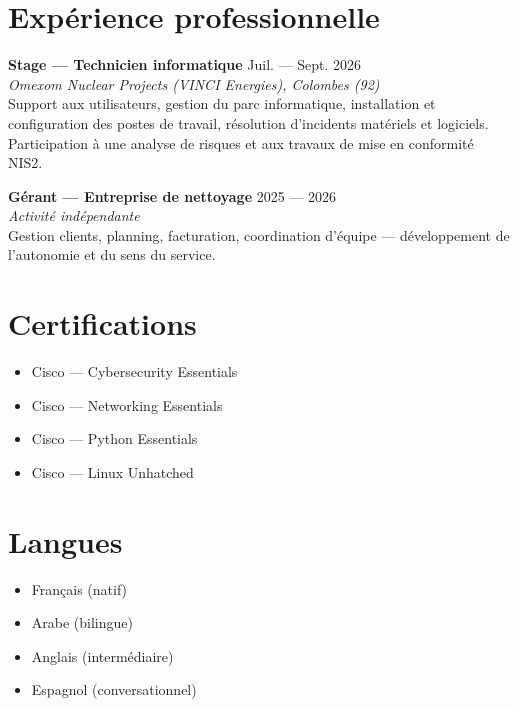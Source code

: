\documentclass[a4paper,10pt]{article}
\newcommand{\cvitem}[4]{%
    \textbf{#1} \hfill \textcolor{muted}{\small #2}\\
    \textit{\small #3}\\
    {\small #4}\vspace{4pt}
}
\begin{document}
\section{Expérience professionnelle}

\cvitem{Stage — Technicien informatique}{Juil. — Sept. 2026}{Omexom Nuclear Projects (VINCI Energies), Colombes (92)}{Support aux utilisateurs, gestion du parc informatique, installation et configuration des postes de travail, résolution d'incidents matériels et logiciels. Participation à une analyse de risques et aux travaux de mise en conformité NIS2.}

\cvitem{Gérant — Entreprise de nettoyage}{2025 — 2026}{Activité indépendante}{Gestion clients, planning, facturation, coordination d'équipe — développement de l'autonomie et du sens du service.}

\begin{minipage}[t]{0.62\textwidth}
    \section{Certifications}
    \begin{itemize}[leftmargin=*, nosep, label=\color{accent}\textbullet]
        \item Cisco — Cybersecurity Essentials
        \item Cisco — Networking Essentials
        \item Cisco — Python Essentials
        \item Cisco — Linux Unhatched
    \end{itemize}
\end{minipage}
\hfill
\begin{minipage}[t]{0.34\textwidth}
    \section{Langues}
    \begin{itemize}[leftmargin=*, nosep, label=\color{accent}\textbullet]
        \item Français (natif)
        \item Arabe (bilingue)
        \item Anglais (intermédiaire)
        \item Espagnol (conversationnel)
    \end{itemize}
\end{minipage}
\end{document}
